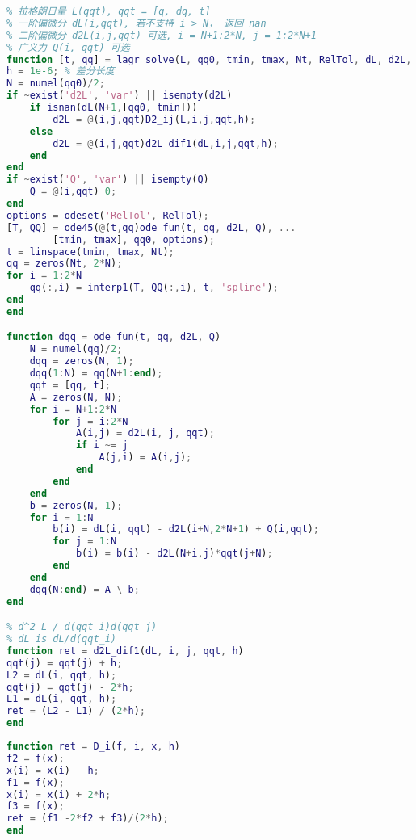 \begin{lstlisting}[language=matlab, caption=TDSE\_cn1d.m]
% 数值解拉格朗日方程
% 拉格朗日量 L(qqt), qqt = [q, dq, t]
% 一阶偏微分 dL(i,qqt), 若不支持 i > N， 返回 nan
% 二阶偏微分 d2L(i,j,qqt) 可选, i = N+1:2*N, j = 1:2*N+1
% 广义力 Q(i, qqt) 可选
function [t, qq] = lagr_solve(L, qq0, tmin, tmax, Nt, RelTol, dL, d2L, Q)
h = 1e-6; % 差分长度
N = numel(qq0)/2;
if ~exist('d2L', 'var') || isempty(d2L)
    if isnan(dL(N+1,[qq0, tmin]))
        d2L = @(i,j,qqt)D2_ij(L,i,j,qqt,h);
    else
        d2L = @(i,j,qqt)d2L_dif1(dL,i,j,qqt,h);
    end
end
if ~exist('Q', 'var') || isempty(Q)
    Q = @(i,qqt) 0;
end
options = odeset('RelTol', RelTol);
[T, QQ] = ode45(@(t,qq)ode_fun(t, qq, d2L, Q), ...
        [tmin, tmax], qq0, options);
t = linspace(tmin, tmax, Nt);
qq = zeros(Nt, 2*N);
for i = 1:2*N
    qq(:,i) = interp1(T, QQ(:,i), t, 'spline');
end
end

function dqq = ode_fun(t, qq, d2L, Q)
    N = numel(qq)/2;
    dqq = zeros(N, 1);
    dqq(1:N) = qq(N+1:end);
    qqt = [qq, t];
    A = zeros(N, N);
    for i = N+1:2*N
        for j = i:2*N
            A(i,j) = d2L(i, j, qqt);
            if i ~= j
                A(j,i) = A(i,j);
            end
        end
    end
    b = zeros(N, 1);
    for i = 1:N
        b(i) = dL(i, qqt) - d2L(i+N,2*N+1) + Q(i,qqt);
        for j = 1:N
            b(i) = b(i) - d2L(N+i,j)*qqt(j+N);
        end
    end
    dqq(N:end) = A \ b;
end

% d^2 L / d(qqt_i)d(qqt_j)
% dL is dL/d(qqt_i)
function ret = d2L_dif1(dL, i, j, qqt, h)
qqt(j) = qqt(j) + h;
L2 = dL(i, qqt, h);
qqt(j) = qqt(j) - 2*h;
L1 = dL(i, qqt, h);
ret = (L2 - L1) / (2*h);
end
\end{lstlisting}

\begin{lstlisting}[language=matlab, caption=D\_i.m]
% 数值偏微分
function ret = D_i(f, i, x, h)
f2 = f(x);
x(i) = x(i) - h;
f1 = f(x);
x(i) = x(i) + 2*h;
f3 = f(x);
ret = (f1 -2*f2 + f3)/(2*h);
end
\end{lstlisting}
